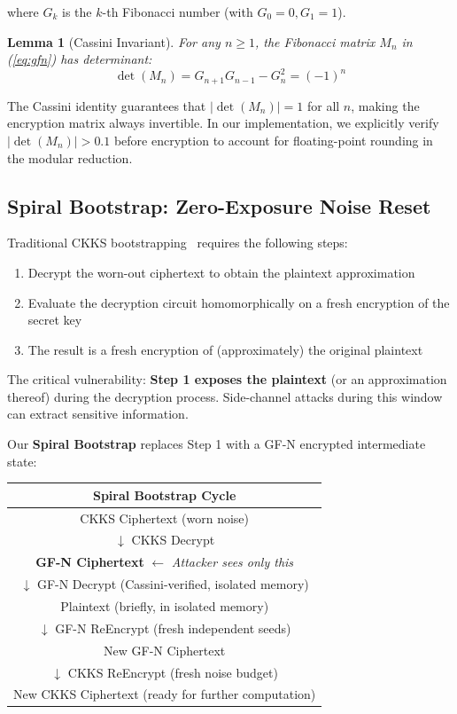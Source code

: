 \documentclass[11pt,a4paper]{article}
\newtheorem{lemma}[theorem]{Lemma}
\begin{document}
where $G_k$ is the $k$-th Fibonacci number (with $G_0 = 0, G_1 = 1$).

\begin{lemma}[Cassini Invariant]\label{lem:cassini}
For any $n \geq 1$, the Fibonacci matrix $M_n$ in (\ref{eq:gfn}) has determinant:
\begin{equation}
\det(M_n) = G_{n+1}G_{n-1} - G_n^2 = (-1)^n
\end{equation}
\end{lemma}

The Cassini identity guarantees that $|\det(M_n)| = 1$ for all $n$, making the encryption matrix always invertible. In our implementation, we explicitly verify $|\det(M_n)| > 0.1$ before encryption to account for floating-point rounding in the modular reduction.

\subsection{Spiral Bootstrap: Zero-Exposure Noise Reset}

Traditional CKKS bootstrapping~\cite{CHK+18} requires the following steps:
\begin{enumerate}[nosep]
    \item Decrypt the worn-out ciphertext to obtain the plaintext approximation
    \item Evaluate the decryption circuit homomorphically on a fresh encryption of the secret key
    \item The result is a fresh encryption of (approximately) the original plaintext
\end{enumerate}

The critical vulnerability: \textbf{Step 1 exposes the plaintext} (or an approximation thereof) during the decryption process. Side-channel attacks during this window can extract sensitive information.

Our \textbf{Spiral Bootstrap} replaces Step 1 with a GF-N encrypted intermediate state:

\begin{center}
\begin{tabular}{c}
\textbf{Spiral Bootstrap Cycle} \\
\hline
CKKS Ciphertext (worn noise) \\
$\downarrow$ CKKS Decrypt \\
\textbf{GF-N Ciphertext} $\leftarrow$ \textit{Attacker sees only this} \\
$\downarrow$ GF-N Decrypt (Cassini-verified, isolated memory) \\
Plaintext (briefly, in isolated memory) \\
$\downarrow$ GF-N ReEncrypt (fresh independent seeds) \\
New GF-N Ciphertext \\
$\downarrow$ CKKS ReEncrypt (fresh noise budget) \\
New CKKS Ciphertext (ready for further computation) \\
\hline
\end{tabular}
\end{center}
\end{document}
